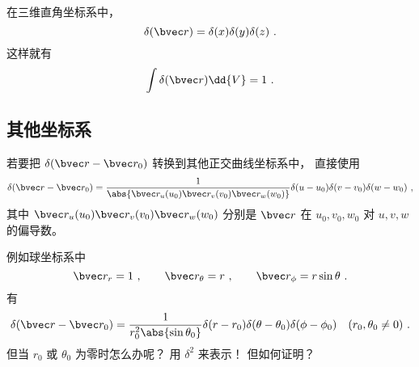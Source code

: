 
\begin{issues}
\issueDraft
\end{issues}


在三维直角坐标系中， 
\begin{equation}
\delta(\bvec r) = \delta(x)\delta(y)\delta(z)~.
\end{equation}
这样就有
\begin{equation}
\int \delta(\bvec r) \dd{V} = 1~.
\end{equation}

\subsection{其他坐标系}
若要把 $\delta(\bvec r - \bvec r_0)$ 转换到其他正交曲线坐标系中， 直接使用
\begin{equation}
\delta(\bvec r - \bvec r_0) = \frac{1}{\abs{\bvec r_u(u_0)\bvec r_v(v_0)\bvec r_w(w_0)}}\delta(u - u_0)\delta(v - v_0)\delta(w - w_0)~,
\end{equation}
其中 $\bvec r_u(u_0)\bvec r_v(v_0)\bvec r_w(w_0)$ 分别是 $\bvec r$ 在 $u_0,v_0,w_0$ 对 $u, v, w$ 的偏导数。

例如球坐标系中
\begin{equation}
\bvec r_r = 1 ~,\qquad \bvec r_\theta = r~, \qquad \bvec r_\phi = r\sin\theta~.
\end{equation}
有
\begin{equation}
\delta(\bvec r - \bvec r_0) = \frac{1}{r_0^2\abs{\sin\theta_0}}\delta(r - r_0)\delta(\theta - \theta_0)\delta(\phi - \phi_0)
\quad (r_0, \theta_0 \ne 0)~.
\end{equation}
但当 $r_0$ 或 $\theta_0$ 为零时怎么办呢？ 用 $\delta^2$ 来表示！ 但如何证明？
